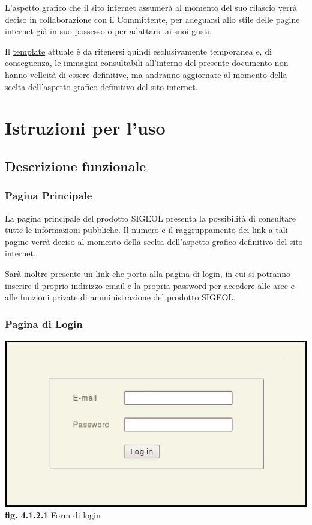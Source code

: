 \documentclass[11pt,a4paper]{article}
\begin{document}
L'aspetto grafico che il sito internet assumerà al momento del suo rilascio verrà deciso in collaborazione con il Committente, per adeguarsi allo stile delle pagine internet già in suo possesso o per adattarsi ai suoi gusti.

Il \underline{template} attuale è da ritenersi quindi esclusivamente temporanea e, di conseguenza, le immagini consultabili all'interno del presente documento non hanno velleità di essere definitive, ma andranno aggiornate al momento della scelta dell'aspetto grafico definitivo del sito internet.
\section{Istruzioni per l'uso}
\subsection{Descrizione funzionale}
\subsubsection{Pagina Principale}
La pagina principale del prodotto SIGEOL presenta la possibilità di consultare tutte le informazioni pubbliche. Il numero e il raggruppamento dei link a tali pagine verrà deciso al momento della scelta dell'aspetto grafico definitivo del sito internet.

Sarà inoltre presente un link che porta alla pagina di login, in cui si potranno inserire il proprio indirizzo email e la propria password per accedere alle aree e alle funzioni private di amministrazione del prodotto SIGEOL.
\subsubsection{Pagina di Login}

\begin{center}
	\includegraphics[scale=0.5]{images/login.jpg}\\
	\textbf{fig. 4.1.2.1} Form di login\\
\end{center}
\end{document}
